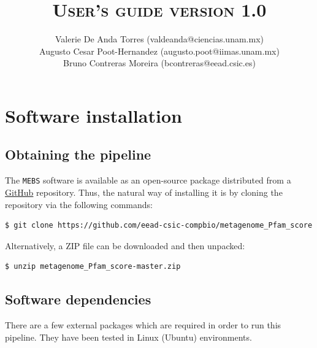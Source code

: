 \documentclass[12pt]{report}
\begin{document}
     

\title{ \normalsize \textsc{User's guide version 1.0}}
        
\date{}

\author{
		Valerie De Anda Torres
        (valdeanda@ciencias.unam.mx) \\ 
    Augusto Cesar Poot-Hernandez
    (augusto.poot@iimas.unam.mx) \\
		Bruno Contreras Moreira
        (bcontreras@eead.csic.es) }

\maketitle
\tableofcontents
\newpage

\sectionfont{\scshape}

\chapter{Software installation}

\section{Obtaining the pipeline}
The \texttt{MEBS} software is available as an open-source package distributed from a \href{https://github.com/eead-csic-compbio/metagenome_Pfam_score}{GitHub}
repository. Thus, the natural way of installing it is by cloning the repository via the following commands:
\begin{verbatim}
$ git clone https://github.com/eead-csic-compbio/metagenome_Pfam_score
\end{verbatim}
       
Alternatively, a ZIP file can be downloaded and then unpacked:
\begin{verbatim}
$ unzip metagenome_Pfam_score-master.zip
\end{verbatim}

\section{Software dependencies}
There are a few external packages which are required in order to run this pipeline. They have been tested in Linux (Ubuntu) environments. 
\end{document}
